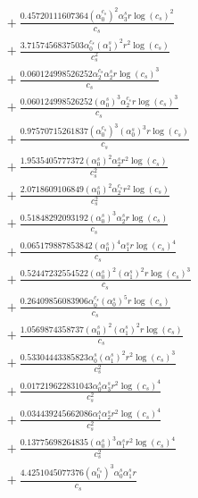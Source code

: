 \documentclass[10pt]{article}
\begin{document}
\begin{align*}
&{}  + \frac{0.45720111607364 \left(\alpha_{0}^{c_s}\right)^{2} \alpha_{3}^s r \log{\left(c_{s} \right)}^{2}}{c_{s}} \\
&{}  + \frac{3.7157456837503 \alpha_{0}^{c_s} \left(\alpha_{1}^s\right)^{2} r^{2} \log{\left(c_{s} \right)}}{c_{s}^{2}} \\
&{}  + \frac{0.060124998526252 \alpha_{2}^{c_s} \alpha_{2}^s r \log{\left(c_{s} \right)}^{3}}{c_{s}} \\
&{}  + \frac{0.060124998526252 \left(\alpha_{0}^s\right)^{3} \alpha_{2}^{c_s} r \log{\left(c_{s} \right)}^{3}}{c_{s}} \\
&{}  + \frac{0.97570715261837 \left(\alpha_{0}^{c_s}\right)^{3} \left(\alpha_{0}^s\right)^{3} r \log{\left(c_{s} \right)}}{c_{s}} \\
&{}  + \frac{1.9535405777372 \left(\alpha_{0}^s\right)^{2} \alpha_{2}^s r^{2} \log{\left(c_{s} \right)}}{c_{s}^{2}} \\
&{}  + \frac{2.0718609106849 \left(\alpha_{0}^s\right)^{2} \alpha_{2}^{c_s} r^{2} \log{\left(c_{s} \right)}}{c_{s}^{2}} \\
&{}  + \frac{0.51848292093192 \left(\alpha_{0}^s\right)^{3} \alpha_{2}^s r \log{\left(c_{s} \right)}}{c_{s}} \\
&{}  + \frac{0.065179887853842 \left(\alpha_{0}^s\right)^{4} \alpha_{1}^s r \log{\left(c_{s} \right)}^{4}}{c_{s}} \\
&{}  + \frac{0.52447232554522 \left(\alpha_{0}^s\right)^{2} \left(\alpha_{1}^s\right)^{2} r \log{\left(c_{s} \right)}^{3}}{c_{s}} \\
&{}  + \frac{0.26409856083906 \alpha_{0}^{c_s} \left(\alpha_{0}^s\right)^{5} r \log{\left(c_{s} \right)}}{c_{s}} \\
&{}  + \frac{1.0569874358737 \left(\alpha_{0}^s\right)^{2} \left(\alpha_{1}^s\right)^{2} r \log{\left(c_{s} \right)}}{c_{s}} \\
&{}  + \frac{0.53304443385823 \alpha_{0}^s \left(\alpha_{1}^s\right)^{2} r^{2} \log{\left(c_{s} \right)}^{3}}{c_{s}^{2}} \\
&{}  + \frac{0.017219622831043 \alpha_{0}^s \alpha_{3}^s r^{2} \log{\left(c_{s} \right)}^{4}}{c_{s}^{2}} \\
&{}  + \frac{0.034439245662086 \alpha_{1}^s \alpha_{2}^s r^{2} \log{\left(c_{s} \right)}^{4}}{c_{s}^{2}} \\
&{}  + \frac{0.13775698264835 \left(\alpha_{0}^s\right)^{3} \alpha_{1}^s r^{2} \log{\left(c_{s} \right)}^{4}}{c_{s}^{2}} \\
&{}  + \frac{4.4251045077376 \left(\alpha_{0}^{c_s}\right)^{3} \alpha_{0}^s \alpha_{1}^s r}{c_{s}} \\

\end{align*}
\end{document}
